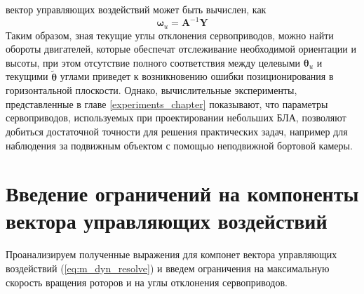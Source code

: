 вектор управляющих воздействий может быть вычислен, как
\begin{equation}
\bm \omega_u = 
\bm A^{-1} \bm Y
\end{equation}
Таким образом, зная текущие углы отклонения сервоприводов, можно найти обороты двигателей,
которые обеспечат отслеживание необходимой ориентации и высоты, при этом отсутствие полного соответствия между целевыми $\bm \theta_u$ и текущими $\tilde {\bm \theta}$ углами приведет к возникновению ошибки позиционирования в горизонтальной плоскости. Однако, вычислительные эксперименты, представленные в главе \ref{experiments_chapter} показывают, что параметры сервоприводов, используемых при проектировании небольших БЛА, позволяют добиться достаточной точности для решения практических задач, например для наблюдения за подвижным объектом с помощью неподвижной бортовой камеры.

\section{Введение ограничений на компоненты вектора управляющих воздействий}
\label{section:limits}

Проанализируем полученные выражения для компонет вектора управляющих воздействий (\ref{eq:m_dyn_resolve}) и введем ограничения на максимальную скорость вращения роторов и на углы отклонения сервоприводов.

